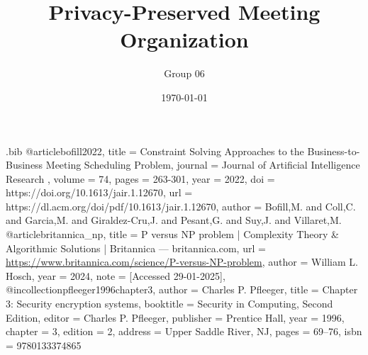 \begin{filecontents}{\jobname.bib}
    @article{bofill2022,
        title = {Constraint Solving Approaches to the Business-to-Business Meeting Scheduling Problem},
        journal = {Journal of Artificial Intelligence Research },
        volume = {74},
        pages = {263-301},
        year = {2022},
        doi = {https://doi.org/10.1613/jair.1.12670},
        url = {https://dl.acm.org/doi/pdf/10.1613/jair.1.12670},
        author = {Bofill,M. and Coll,C. and Garcia,M. and Giraldez-Cru,J. and Pesant,G. and Suy,J. and Villaret,M.}
    }
    @article{britannica_np,
	    title = {{P} versus {N}{P} problem | {C}omplexity {T}heory \& {A}lgorithmic {S}olutions | {B}ritannica --- britannica.com},
	    url = {\url{https://www.britannica.com/science/P-versus-NP-problem}},
	    author = {William L. Hosch},
        year = {2024},
	    note = {[Accessed 29-01-2025]},
    }
    @incollection{pfleeger1996chapter3,
        author = {Charles P. Pfleeger},
        title = {Chapter 3: Security encryption systems},
        booktitle = {Security in Computing, Second Edition},
        editor = {Charles P. Pfleeger},
        publisher = {Prentice Hall},
        year = {1996},
        chapter = {3},
        edition = {2},
        address = {Upper Saddle River, NJ},
        pages = {69--76},
        isbn = {9780133374865}
    }
\end{filecontents}

\documentclass[a4paper, 12pt]{article}
\usepackage[left=1.5in,right=1in,top=1.5in,bottom=1in]{geometry}
\usepackage{graphicx}
\usepackage{makeidx}
\usepackage{hyperref}
\usepackage{array}
\usepackage{mathrsfs}
\usepackage{amsmath}
\usepackage{amssymb}
\usepackage{multirow}
\usepackage{array}
\usepackage{float}
\usepackage{algorithm}
\usepackage{algpseudocode}
\usepackage[backend=biber,style=authoryear,autocite=inline, maxbibnames=9 ]{biblatex}


\makeindex

\title{Privacy-Preserved Meeting Organization}
\author{Group 06}
\date{\today} %



\maketitle
